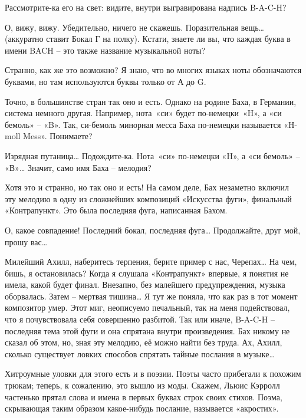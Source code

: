 \documentclass[../main.tex]{subfiles}
\begin{document}
\begin{dialogue}
 Рассмотрите-ка его на свет: видите, внутри выгравирована надпись \mbox{B-A-C-H}?

 О, вижу, вижу. Убедительно, ничего не скажешь. Поразительная вещь\ldots{} (аккуратно ставит Бокал Г на полку). Кстати, знаете ли вы, что каждая буква в имени BACH \--- это также название музыкальной ноты?

 Странно, как же это возможно? Я знаю, что во многих языках ноты обозначаются буквами, но там используются буквы только от А до G.

 Точно, в большинстве стран так оно и есть. Однако на родине Баха, в Германии, система немного другая. Например, нота~«си» будет по-немецки~«H», а «си бемоль» \--- «B». Так, си-бемоль минорная месса Баха по-немецки называется «H-moll Mess». Понимаете?

 Изрядная путаница\ldots{} Подождите-ка. Нота~«си» по-немецки «H», а «си бемоль» \--- «В»\ldots{} Значит, само имя Баха \--- мелодия?

 Хотя это и странно, но так оно и есть! На самом деле, Бах незаметно включил эту мелодию в одну из сложнейших композиций «Искусства фуги», финальный «Контрапункт». Это была последняя фуга, написанная Бахом.

 О, какое совпадение! Последний бокал, последняя фуга\ldots{} Продолжайте, друг мой, прошу вас\ldots{}

 Милейший Ахилл, наберитесь терпения, берите пример с нас, Черепах\ldots{} На чем, бишь, я остановилась? Когда я слушала «Контрапункт» впервые, я понятия не имела, какой будет финал. Внезапно, без малейшего предупреждения, музыка оборвалась. Затем \--- мертвая тишина\ldots{} Я тут же поняла, что как раз в тот момент композитор умер. Этот миг, неописуемо печальный, так на меня подействовал, что я почувствовала себя совершенно разбитой. Так или иначе, \mbox{B-A-C-H} \--- последняя тема этой фуги и она спрятана внутри произведения. Бах никому не сказал об этом, но, зная эту мелодию, её можно найти без труда. Ах, Ахилл, сколько существует ловких способов спрятать тайные послания в музыке\ldots{}

 {\Large Х}итроумные уловки для этого есть и в поэзии. Поэты часто прибегали к похожим трюкам; теперь, к сожалению, это вышло из моды. Скажем, Льюис Кэрролл частенько прятал слова и имена в первых буквах строк своих стихов. Поэма, скрывающая таким образом какое-нибудь послание, называется «акростих».


\end{dialogue}
\end{document}
